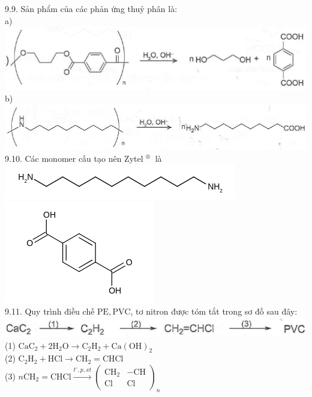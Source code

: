 \documentclass[10pt]{article}
\begin{document}
9.9. Sản phẩm của các phản ứng thuỷ phân là:\\
a)\\
\includegraphics[max width=\textwidth, center]{2025_10_23_b4e16b74380d0f7e7700g-061(3)}\\
b)\\
\includegraphics[max width=\textwidth, center]{2025_10_23_b4e16b74380d0f7e7700g-061(1)}\\
9.10. Các monomer cấu tạo nên Zytel ${ }^{\text {® }}$ là\\
\includegraphics{smile-b454f4bd011139eca0c4bfe8699d34ee11bcbc29}\\
\includegraphics{smile-df2019a795589c6eae39b20bca564623a98daaa5}\\
9.11. Quy trình điều chế $\mathrm{PE}, \mathrm{PVC}$, tơ nitron được tóm tắt trong sơ đồ sau đây:\\
\includegraphics[max width=\textwidth, center]{2025_10_23_b4e16b74380d0f7e7700g-061}\\
(1) $\mathrm{CaC}_{2}+2 \mathrm{H}_{2} \mathrm{O} \longrightarrow \mathrm{C}_{2} \mathrm{H}_{2}+\mathrm{Ca}(\mathrm{OH})_{2}$\\
(2) $\mathrm{C}_{2} \mathrm{H}_{2}+\mathrm{HCl} \longrightarrow \mathrm{CH}_{2}=\mathrm{CHCl}$\\
(3) $n \mathrm{CH}_{2}=\mathrm{CHCl} \xrightarrow{t^{\circ}, p, x t}\left(\begin{array}{cc}\mathrm{CH}_{2} & -\mathrm{CH} \\ \mathrm{Cl} & \mathrm{Cl}\end{array}\right)_{n}$
\end{document}
